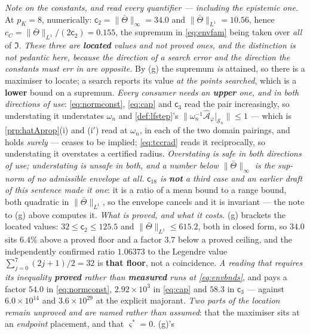 \noindent\emph{Note on the constants, and read every quantifier --- including the epistemic one.} At
$p_K=8$, numerically: $\mathsf c_2=\|\bar\Theta\|_\infty=34.0$ and $\|\bar\Theta\|_{L^{1}}=10.56$, hence
$c_C=\|\bar\Theta\|_{L^{1}}/(2\mathsf c_2)=0.155$, the supremum in \eqref{eq:envfam} being taken over
\emph{all} of $\mathfrak I$. \emph{These three are \textbf{located} values and not proved ones, and the
distinction is not pedantic here, because the direction of a search error and the direction the
constants must err in are opposite.} By \textup{(g)} the supremum \emph{is} attained, so there is a
maximiser to locate; a search reports its value \emph{at the points searched}, which is a \textbf{lower}
bound on a supremum. \emph{Every consumer needs an \textbf{upper} one, and in both directions of use}:
\eqref{eq:normconst}, \eqref{eq:cap} and $\mathsf c_3$ read the pair increasingly, so understating it
understates $\omega_n$ and \cref{def:lfstep}'s $\|\omega_n^{-1}\hat{\mathcal A}_\varphi
\vert_{\mathcal S_n}\|\le1$ --- which is \cref{prp:hatAprop}(i) and (i$'$) read at $\omega_n$, in each
of the two domain pairings, and holds
\emph{surely} --- ceases to be implied; \eqref{eq:tccrad} reads it reciprocally, so understating it
overstates a certified radius. \emph{Overstating is safe in both directions of use; understating is
unsafe in both, and a number below $\|\bar\Theta\|_\infty$ is the sup-norm of no admissible envelope at
all.} \emph{$\mathsf c_{18}$ is \textbf{not} a third case and an earlier draft of this sentence made it
one}: it is a ratio of a mean bound to a range bound, both quadratic in $\|\bar\Theta\|_{L^{1}}$, so the
envelope cancels and it is invariant --- the note to \textup{(g)} above computes it.
\emph{What is proved, and what it costs.} \textup{(g)} brackets the located values:
$32\le\mathsf c_2\le125.5$ and $\|\bar\Theta\|_{L^{1}}\le615.2$, both in closed form, so $34.0$ sits
$6.4\%$ above a proved floor and a factor $3.7$ below a proved ceiling, and the independently confirmed
ratio $1.06373$ to the Legendre value $\sum_{j=0}^{7}(2j+1)/2=32$ is \textbf{that floor}, not a
coincidence. \emph{A reading that requires its inequality \textbf{proved} rather than \textbf{measured}
runs at \eqref{eq:envbnds}}, and pays a factor $54.0$ in \eqref{eq:normconst}, $2.92\times10^{3}$ in
\eqref{eq:cap} and $58.3$ in $\mathsf c_3$ --- against $6.0\times10^{14}$ and $3.6\times10^{29}$ at the
explicit majorant. \emph{Two parts of the location remain unproved and are named rather than assumed}:
that the maximiser sits at an \emph{endpoint} placement, and that $\varsigma^\ast=0$. \textup{(g)}'s
